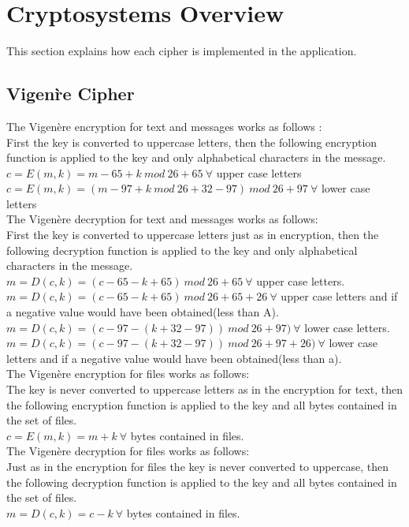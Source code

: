 \documentclass[11pt]{article}
\begin{document}
	\section{Cryptosystems Overview}
	This section explains how each cipher is implemented in the application.
	\subsection{Vigen\`re Cipher}
	The Vigen\`ere encryption for text and messages works as follows \cite{bruen2011cryptography}:\\
	First the key is converted to uppercase letters, then the following encryption function is applied to the key and only alphabetical characters in the message.\\
	$c = E(m, k) = m - 65 + k\ mod\ 26 + 65\ \forall$ upper case letters\\
	$c = E(m, k) = (m - 97 + k \ mod \ 26 + 32 - 97)\ mod\ 26 + 97\ \forall$ lower case letters\\

	The Vigen\`ere decryption for text and messages works as follows:\\
	First the key is converted to uppercase letters just as in encryption, then the following decryption function is applied to the key and only alphabetical characters in the message.\\
	$m = D(c, k) = (c - 65 - k + 65)\ mod\ 26 + 65\ \forall$ upper case letters.\\
	$m = D(c, k) = (c - 65 - k + 65)\ mod\ 26 + 65 + 26\ \forall$ upper case letters and if a negative value would have been obtained(less than A).\\
		$m = D(c, k) = (c - 97 - (k + 32 - 97)) \ mod \ 26 + 97)\ \forall$ lower case letters.\\
	$m = D(c, k) = (c - 97 - (k + 32 - 97)) \ mod \ 26 + 97 + 26)\ \forall$ lower case letters and if a negative value would have been obtained(less than a).\\

	The Vigen\`ere encryption for files works as follows:\\
	The key is never converted to uppercase letters as in the encryption for text, then the following encryption function is applied to the key and all bytes contained in the set of files.\\
	$c = E(m, k) = m + k\ \forall$ bytes contained in files.\\

	The Vigen\`ere decryption for files works as follows:\\
	Just as in the encryption for files the key is never converted to uppercase, then the following decryption function is applied to the key and all bytes contained in the set of files.\\
	$m = D(c, k) = c - k\ \forall$ bytes contained in files.\\
\end{document}
